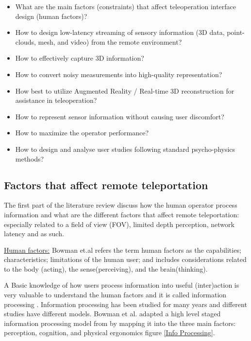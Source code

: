 \begin{itemize}
    \item What are the main factors (constraints) that affect teleoperation interface design (human factors)?
    \item How to design low-latency streaming of sensory information (3D data, point-clouds, mesh, and video) from the remote environment?
    \item How to effectively capture 3D information?
    \item How to convert noisy measurements into high-quality representation?
    \item How best to utilize Augmented Reality / Real-time 3D reconstruction for assistance in teleoperation?
    \item How to represent sensor information without causing user discomfort?
    \item How to maximize the operator performance?
    \item How to design and analyse user studies following standard psycho-physics methods?
\end{itemize}


\subsection{Factors that affect remote teleportation}

The first part of the literature review discuss how the human operator process information and what are the different factors that affect remote teleportation: especially related to a field of view (FOV), limited depth perception, network latency and as such.

\underline{Human factors:} Bowman et.al  \cite{Bowman:2004:UIT:993837} refers the term human factors as the capabilities; characteristics; limitations of the human user; and includes considerations related to the body (acting), the sense(perceiving), and the brain(thinking).

A Basic knowledge of how users process information into useful (inter)action is very valuable to understand the human factors and it is called information processing \cite{Bowman:2004:UIT:993837}. Information processing has been studied for many years and different studies have different models. Bowman et al. \cite{Bowman:2004:UIT:993837} adapted a high level staged information processing model from \cite{PMID:11540969} by mapping it into the three main factors: perception, cognition, and physical ergonomics figure \ref{Info Processing}.

